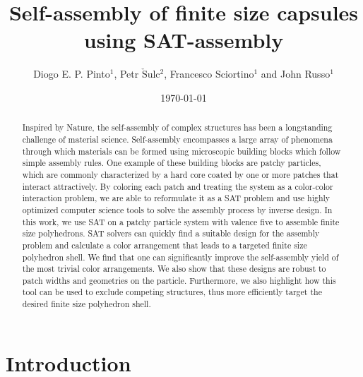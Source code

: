 \documentclass[a4paper, amsfonts, amssymb, amsmath, reprint, showkeys, nofootinbib, twoside]{revtex4-1}
\begin{document}
\title{Self-assembly of finite size capsules using SAT-assembly}

\author{Diogo E. P. Pinto$^1$, Petr $\check{\text{S}}$ulc$^2$, Francesco Sciortino$^1$ and John Russo$^1$}

\date{\today} %

\begin{abstract}
Inspired by Nature, the self-assembly of complex structures has been a longstanding challenge of material science. Self-assembly encompasses a large array of phenomena through which materials can be formed using microscopic building blocks which follow simple assembly rules. One example of these building blocks are patchy particles, which are commonly characterized by a hard core coated by one or more patches that interact attractively. By coloring each patch and treating the system as a color-color interaction problem, we are able to reformulate it as a SAT problem and use highly optimized computer science tools to solve the assembly process by inverse design. In this work, we use SAT on a patchy particle system with valence five to assemble finite size polyhedrons. SAT solvers can quickly find a suitable design for the assembly problem and calculate a color arrangement that leads to a targeted finite size polyhedron shell. We find that one can significantly improve the self-assembly yield of the most trivial color arrangements. We also show that these designs are robust to patch widths and geometries on the particle. Furthermore, we also highlight how this tool can be used to exclude competing structures, thus more efficiently target the desired finite size polyhedron shell.
\end{abstract}

\maketitle

\section{Introduction}
\end{document}
